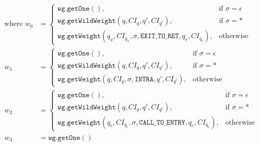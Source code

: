\begin{changebar}

\begin{align*}
\text{where }
w_0 & = \begin{cases}
        \mathtt{wg.getOne}(), & \text{if } \sigma = \epsilon \\
        \mathtt{wg.getWildWeight}(q,CI_q,q',CI_{q'}), & \text{if } \sigma = \text{*} \\
        \mathtt{wg.getWeight}(q_x,CI_{q_x},\sigma,\mathtt{EXIT\_TO\_RET},q_r,CI_{q_r}), & \text{otherwise}
      \end{cases}  \\
w_1 &= \begin{cases}
         \mathtt{wg.getOne}(), & \text{if } \sigma = \epsilon \\
         \mathtt{wg.getWildWeight}(q,CI_q,q',CI_{q'}), & \text{if } \sigma = \text{*} \\
         \mathtt{wg.getWeight}(q,CI_q,\sigma,\mathtt{INTRA},q',CI_{q'}), & \text{otherwise}
      \end{cases} \\
w_2 &= \begin{cases}
         \mathtt{wg.getOne}(), & \text{if } \sigma = \epsilon \\
         \mathtt{wg.getWildWeight}(q,CI_q,q',CI_{q'}), & \text{if } \sigma = \text{*} \\
         \mathtt{wg.getWeight}(q_c,CI_{q_c},\sigma,\mathtt{CALL\_TO\_ENTRY},q_e,CI_{q_e}), & \text{otherwise}
      \end{cases} \\
w_3 &= \mathtt{wg.getOne}() 
\end{align*}
\end{changebar}

